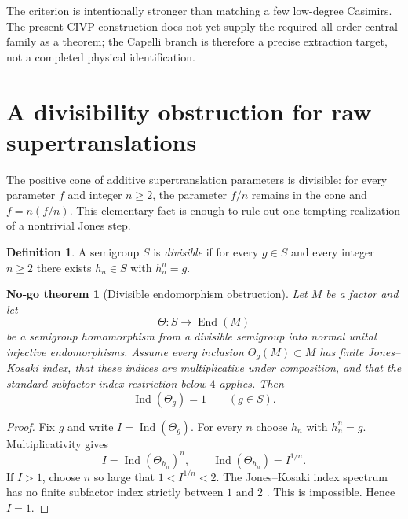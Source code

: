 \documentclass[aps,prd,preprint,nofootinbib,superscriptaddress]{revtex4-2}
\newtheorem{nogotheorem}[theorem]{No-go theorem}
\theoremstyle{definition}
\newtheorem{definition}[theorem]{Definition}
\theoremstyle{remark}
\newcommand{\Ind}{\operatorname{Ind}}
\begin{document}
The criterion is intentionally stronger than matching a few low-degree Casimirs.  The present CIVP construction does not yet supply the required all-order central family as a theorem; the Capelli branch is therefore a precise extraction target, not a completed physical identification.

\section{A divisibility obstruction for raw supertranslations}
\label{sec:divisible}

The positive cone of additive supertranslation parameters is divisible: for every parameter $f$ and integer $n\ge2$, the parameter $f/n$ remains in the cone and $f=n(f/n)$.  This elementary fact is enough to rule out one tempting realization of a nontrivial Jones step.

\begin{definition}
A semigroup $S$ is \emph{divisible} if for every $g\in S$ and every integer $n\ge2$ there exists $h_n\in S$ with $h_n^n=g$.
\end{definition}

\begin{nogotheorem}[Divisible endomorphism obstruction]
\label{thm:divisible}
Let $M$ be a factor and let
\begin{equation}
\Theta:S\longrightarrow \operatorname{End}(M)
\end{equation}
be a semigroup homomorphism from a divisible semigroup into normal unital injective endomorphisms.  Assume every inclusion $\Theta_g(M)\subset M$ has finite Jones--Kosaki index, that these indices are multiplicative under composition, and that the standard subfactor index restriction below $4$ applies.  Then
\begin{equation}
\Ind(\Theta_g)=1
\qquad
(g\in S).
\label{eq:divisible-index-one}
\end{equation}
\end{nogotheorem}

\begin{proof}
Fix $g$ and write $I=\Ind(\Theta_g)$.  For every $n$ choose $h_n$ with $h_n^n=g$.  Multiplicativity gives
\begin{equation}
I=\Ind(\Theta_{h_n})^n,
\qquad
\Ind(\Theta_{h_n})=I^{1/n}.
\end{equation}
If $I>1$, choose $n$ so large that $1<I^{1/n}<2$.  The Jones--Kosaki index spectrum has no finite subfactor index strictly between $1$ and $2$ \cite{Jones1983,Kosaki1986}.  This is impossible.  Hence $I=1$.
\end{proof}
\end{document}
